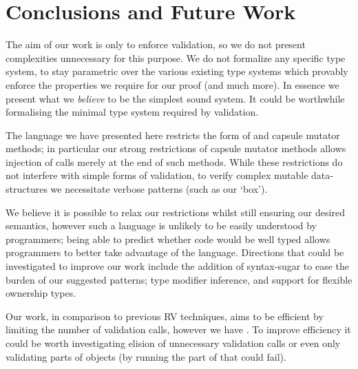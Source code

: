 \section{Conclusions and Future Work}

\LINE
\noindent{}

The aim of our work is only to enforce validation, so we do not present complexities unnecessary for this purpose. We do not formalize any specific type system, to stay parametric over 
the various existing type systems which provably enforce the properties we require for our proof (and much more).
In essence we present what we \emph{believe} to be the simplest sound system.
It could be worthwhile formalising the minimal type system required by validation.






The language we have presented here restricts the form of \validate
and capsule mutator methods; in particular
our strong restrictions of capsule mutator methods
allows injection of \validate{} calls merely at the end of such methods.
While these restrictions do not interfere with simple
forms of validation, to verify complex mutable data-structures we necessitate verbose patterns (such as our `box').

We believe it is possible to relax our restrictions whilst
still ensuring our desired semantics, however such a language is unlikely to be easily understood by programmers;
being able to predict whether code would be well typed allows programmers
to better take advantage of the language.
Directions that could be investigated to improve our work include the addition of syntax-sugar to ease the burden of our suggested patterns; type modifier inference, and support for flexible ownership types.

Our work, in comparison to previous RV techniques, aims to be efficient by limiting the number of validation calls, however we have .
To improve efficiency it could be worth investigating elision of unnecessary validation calls
or even only validating parts of objects (by running the part of \Q@validate@ that could fail).